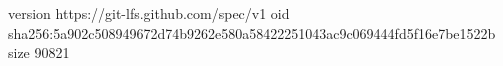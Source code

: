 version https://git-lfs.github.com/spec/v1
oid sha256:5a902c508949672d74b9262e580a58422251043ac9c069444fd5f16e7be1522b
size 90821
